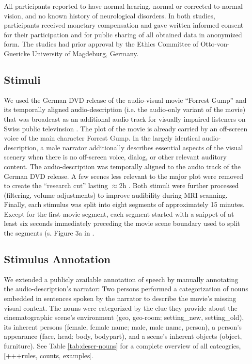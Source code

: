 \documentclass[english]{article}
\begin{document}
All participants reported to have normal hearing, normal or corrected-to-normal vision, and no known history of neurological disorders.
In both studies, participants received monetary compensation and gave written informed consent for their participation and for public sharing of all obtained data in anonymized form. The studies had prior approval by the Ethics Committee of Otto-von-Guericke University of Magdeburg, Germany.


\subsection{Stimuli}
We used the German DVD release \citep{ForrestGumpDVD} of the audio-visual movie ``Forrest Gump'' \citep{ForrestGumpMovie} and its temporally aligned audio-description (i.e. the audio-only variant of the movie) that was broadcast as an additional audio track for visually impaired listeners on Swiss public televinsion \citep{ForrestGumpGermanAD}.
The plot of the movie is already carried by an off-screen voice of the main character Forrest Gump.
In the largely identical audio-description, a male narrator additionally describes essential aspects of the visual scenery when there is no off-screen voice, dialog, or other relevant auditory content.
The audio-description was temporally aligned to the audio track of the German DVD release. A few scenes less relevant to the major plot were removed to create the ``research cut'' lasting $\approx$2h \citep{hanke2014audiomovie,hanke2016simultaneous}.
Both stimuli were further processed (filtering, volume adjustments) to improve audibility during MRI scanning.
Finally, each stimulus was split into eight segments of approximately 15 minutes.
Except for the first movie segment, each segment started with a snippet of at least six seconds immediately preceding the movie scene boundary used to split the segments (s. Figure 3a in \citep{hanke2014audiomovie}.


\subsection{Stimulus Annotation}
We extended a publicly available annotation of speech \citep{haeusler2020speechanno} by manually annotating the audio-description's narrator:
Two persons performed a categorization of nouns embedded in sentences spoken by the narrator to describe the movie's missing visual content.
The nouns were categorized by the clue they provide about the cinematographic scene's environment (geo, geo-room; setting\_new, setting\_old), its inherent persons (female, female name; male, male name, person), a person's appearance (face, head; body, bodypart), and a scene's inherent objects (object, furniture).
See Table \ref{tab:descr-nouns} for a complete overview of all cateogries, [+++rules, counts, examples].
\end{document}
